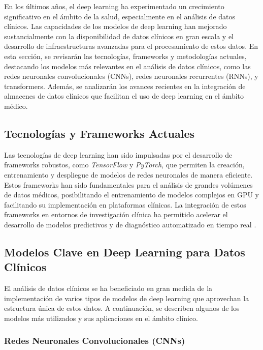 \documentclass{article}
\begin{document}
En los últimos años, el deep learning ha experimentado un crecimiento significativo en el ámbito de la salud, especialmente en el análisis de datos clínicos. Las capacidades de los modelos de deep learning han mejorado sustancialmente con la disponibilidad de datos clínicos en gran escala y el desarrollo de infraestructuras avanzadas para el procesamiento de estos datos. En esta sección, se revisarán las tecnologías, frameworks y metodologías actuales, destacando los modelos más relevantes en el análisis de datos clínicos, como las redes neuronales convolucionales (CNNs), redes neuronales recurrentes (RNNs), y transformers. Además, se analizarán los avances recientes en la integración de almacenes de datos clínicos que facilitan el uso de deep learning en el ámbito médico.

\subsection{Tecnologías y Frameworks Actuales}

Las tecnologías de deep learning han sido impulsadas por el desarrollo de frameworks robustos, como \textit{TensorFlow} y \textit{PyTorch}, que permiten la creación, entrenamiento y despliegue de modelos de redes neuronales de manera eficiente. Estos frameworks han sido fundamentales para el análisis de grandes volúmenes de datos médicos, posibilitando el entrenamiento de modelos complejos en GPU y facilitando su implementación en plataformas clínicas. La integración de estos frameworks en entornos de investigación clínica ha permitido acelerar el desarrollo de modelos predictivos y de diagnóstico automatizado en tiempo real \cite{abadi2016tensorflow, paszke2019pytorch}.

\subsection{Modelos Clave en Deep Learning para Datos Clínicos}

El análisis de datos clínicos se ha beneficiado en gran medida de la implementación de varios tipos de modelos de deep learning que aprovechan la estructura única de estos datos. A continuación, se describen algunos de los modelos más utilizados y sus aplicaciones en el ámbito clínico.

\subsubsection{Redes Neuronales Convolucionales (CNNs)}
\end{document}
